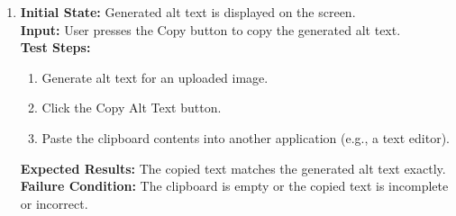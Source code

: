 \documentclass[12pt, titlepage]{article}
\begin{document}
\begin{enumerate}[label=UII-MT \arabic*., wide=0pt, leftmargin=*]
  \item{}
    {\bf Initial State:} Generated alt text is displayed on the screen. \\
    {\bf Input:} User presses the Copy button to copy the generated alt text. \\
    {\bf Test Steps:}
    \begin{enumerate}
      \item Generate alt text for an uploaded image.
      \item Click the Copy Alt Text button.
      \item Paste the clipboard contents into another application
        (e.g., a text editor).
    \end{enumerate}
    {\bf Expected Results:} The copied text matches the generated alt
    text exactly. \\
    {\bf Failure Condition:} The clipboard is empty or the copied
    text is incomplete or incorrect. \\


\end{enumerate}
\end{document}
